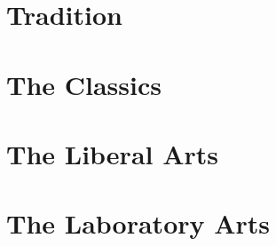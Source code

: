 \documentclass{memoir}
\begin{document}
\chapter{Tradition}

\chapter{The Classics}
\chapter{The Liberal Arts}
\chapter{The Laboratory Arts}
\end{document}

